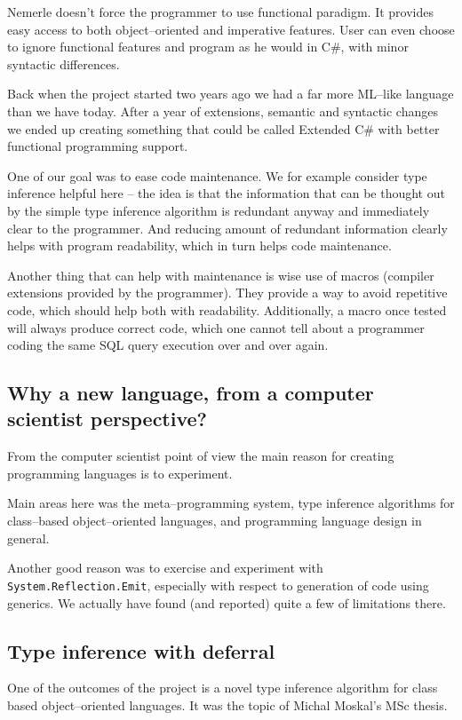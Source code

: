 \documentclass{article}
\begin{document}
Nemerle doesn't force the programmer to use functional paradigm. It provides
easy access to both object--oriented and imperative features. User
can even choose to ignore functional features and program as he would
in C\#, with minor syntactic differences.

Back when the project started two years ago we had a far more ML--like
language than we have today. After a year of extensions, semantic and
syntactic changes we ended up creating something that could be called
Extended C\# with better functional programming support.

One of our goal was to ease code maintenance. We for example consider
type inference helpful here -- the idea is that the information that
can be thought out by the simple type inference algorithm is redundant
anyway and immediately clear to the programmer. And reducing amount
of redundant information clearly helps with program readability, which in
turn helps code maintenance.

Another thing that can help with maintenance is wise use of macros (compiler
extensions provided by the programmer). They
provide a way to avoid repetitive code, which should help both with
readability. Additionally, a macro once tested will always produce correct
code, which one cannot tell about a programmer coding the same SQL 
query execution over and over again.

\subsection{Why a new language, from a computer scientist perspective?}

From the computer scientist point of view the
main reason for creating programming languages is to experiment.

Main areas here was the meta--programming system, type inference
algorithms for class--based object--oriented languages, and programming
language design in general.

Another good reason was to exercise and experiment with {\tt
System.Reflection.Emit}, especially with respect to generation of code
using generics. We actually have found (and reported) quite a few of
limitations there.


\subsection{Type inference with deferral}

One of the outcomes of the project is a novel type inference algorithm
for class based object--oriented languages. It was the topic of Michal
Moskal's MSc thesis.
\end{document}
